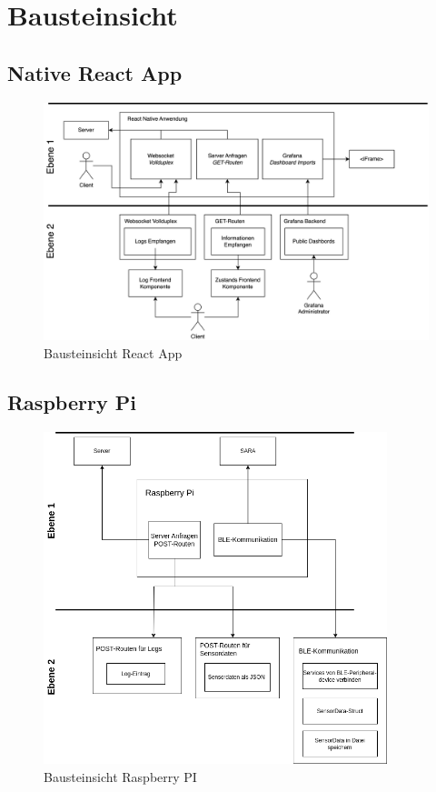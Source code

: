 \documentclass[
]{article}
\begin{document}
\section{Bausteinsicht}

\subsection{Native React App}
\begin{figure}[htbp]
	\centering
	\includegraphics[width=120mm]{resources/BausteinsichtValentin.drawio.png}
	\caption{Bausteinsicht React App}
	\label{fig:BausteinFrontend}
\end{figure}  

\subsection{Raspberry Pi}
\begin{figure}[htbp]
	\centering
	\includegraphics[width=100mm]{resources/ADABausteinsicht.png}
	\caption{Bausteinsicht Raspberry PI}
	\label{fig:BausteinRaspberry}
\end{figure}  
\newpage
\end{document}

